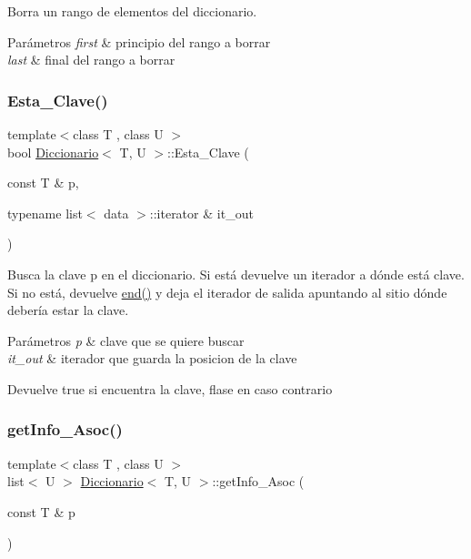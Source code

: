 Borra un rango de elementos del diccionario. 


\begin{DoxyParams}{Parámetros}
{\em first} & principio del rango a borrar \\
\hline
{\em last} & final del rango a borrar \\
\hline
\end{DoxyParams}
\mbox{\label{classDiccionario_a15dbc0f951542ce3e75a35ee38cc9388}} 
\subsubsection{\texorpdfstring{Esta\+\_\+\+Clave()}{Esta\_Clave()}}
{\footnotesize\ttfamily template$<$class T , class U $>$ \\
bool \hyperlink{classDiccionario}{Diccionario}$<$ T, U $>$\+::Esta\+\_\+\+Clave (\begin{DoxyParamCaption}\item[{const T \&}]{p,  }\item[{typename list$<$ data $>$\+::iterator \&}]{it\+\_\+out }\end{DoxyParamCaption})}



Busca la clave p en el diccionario. Si está devuelve un iterador a dónde está clave. Si no está, devuelve \hyperlink{classDiccionario_aa6f9f59a1f6478b7ff61369132fb4061}{end()} y deja el iterador de salida apuntando al sitio dónde debería estar la clave. 


\begin{DoxyParams}{Parámetros}
{\em p} & clave que se quiere buscar \\
\hline
{\em it\+\_\+out} & iterador que guarda la posicion de la clave \\
\hline
\end{DoxyParams}
\begin{DoxyReturn}{Devuelve}
true si encuentra la clave, flase en caso contrario 
\end{DoxyReturn}
\mbox{\label{classDiccionario_a292817b0fda893a41cd9313b4c65cc61}} 
\subsubsection{\texorpdfstring{get\+Info\+\_\+\+Asoc()}{getInfo\_Asoc()}}
{\footnotesize\ttfamily template$<$class T , class U $>$ \\
list$<$ U $>$ \hyperlink{classDiccionario}{Diccionario}$<$ T, U $>$\+::get\+Info\+\_\+\+Asoc (\begin{DoxyParamCaption}\item[{const T \&}]{p }\end{DoxyParamCaption})}



